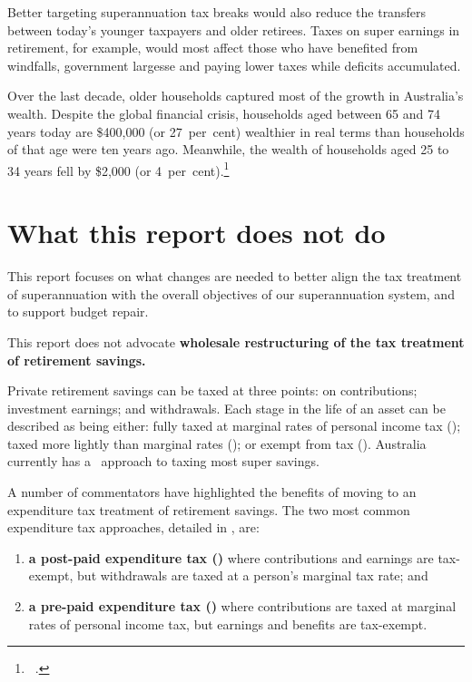 Better targeting superannuation tax breaks would also reduce the transfers between today’s younger taxpayers and older retirees. Taxes on super earnings in retirement, for example, would most affect those who have benefited from windfalls, government largesse and paying lower taxes while deficits accumulated.

Over the last decade, older households captured most of the growth in Australia’s wealth. Despite the global financial crisis, households aged between 65 and 74 years today are \$400,000 (or 27~per~cent) wealthier in real terms than households of that age were ten years ago. Meanwhile, the wealth of households aged 25 to 34 years fell by \$2,000 (or 4~per~cent).\footnote{\gao\ \textcites{ABS2015HouseholdIncomeWealth1314}{ABS2006HES0304}.}

\section{What this report does not do}\label{sec:SUPER-what-this-report-does-not-do}
This report focuses on what changes are needed to better align the tax treatment of superannuation with the overall objectives of our superannuation system, and to support budget repair. 

This report does not advocate \textbf{wholesale restructuring of the tax treatment of retirement savings. }

Private retirement savings can be taxed at three points: on contributions; investment earnings; and withdrawals. Each stage in the life of an asset can be described as being either: fully taxed at marginal rates of personal income tax (\taxabbrevT); taxed more lightly than marginal rates (\taxabbrevt); or exempt from tax (\taxabbrevE). Australia currently has a \ttE\ approach to taxing most super savings.

A number of commentators have highlighted the benefits of moving to an expenditure tax treatment of retirement savings.  The two most common expenditure tax approaches, detailed in , are: 
\begin{enumerate}
\item \textbf{a post-paid expenditure tax (\EET)} where contributions and earnings are tax-exempt, but withdrawals are taxed at a person's marginal tax rate; and
\item \textbf{a pre-paid expenditure tax (\TEE)} where contributions are taxed at marginal rates of personal income tax, but earnings and benefits are tax-exempt. 
\end{enumerate}

